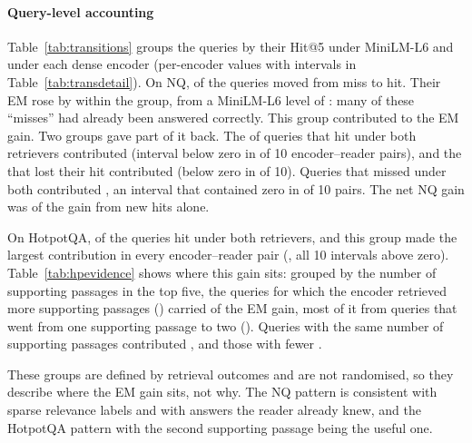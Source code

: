 \paragraph{Query-level accounting}
Table~\ref{tab:transitions} groups the queries by their Hit@5 under MiniLM-L6 and under each dense encoder (per-encoder values with intervals in Table~\ref{tab:transdetail}). On NQ,  of the queries moved from miss to hit. Their EM rose by  within the group, from a MiniLM-L6 level of : many of these ``misses'' had already been answered correctly. This group contributed  to the EM gain. Two groups gave part of it back. The  of queries that hit under both retrievers contributed  (interval below zero in  of 10 encoder--reader pairs), and the  that lost their hit contributed  (below zero in  of 10). Queries that missed under both contributed , an interval that contained zero in  of 10 pairs. The net NQ gain was  of the gain from new hits alone.

On HotpotQA,  of the queries hit under both retrievers, and this group made the largest contribution in every encoder--reader pair (, all 10 intervals above zero). Table~\ref{tab:hpevidence} shows where this gain sits: grouped by the number of supporting passages in the top five, the queries for which the encoder retrieved more supporting passages () carried  of the EM gain, most of it from queries that went from one supporting passage to two (). Queries with the same number of supporting passages contributed , and those with fewer .

These groups are defined by retrieval outcomes and are not randomised, so they describe where the EM gain sits, not why. The NQ pattern is consistent with sparse relevance labels and with answers the reader already knew, and the HotpotQA pattern with the second supporting passage being the useful one.

